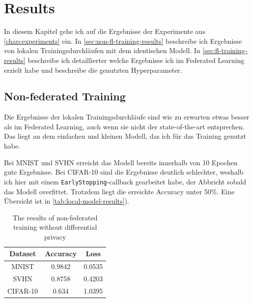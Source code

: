 \chapter{Results}\label{chap:results}

In diesem Kapitel gehe ich auf die Ergebnisse der Experimente aus \autoref{chap:experiments} ein. In \autoref{sec:non-fl-training-results} beschreibe ich Ergebnisse von lokalen Trainingsdurchläufen mit dem identischen Modell. In \autoref{sec:fl-training-results} beschreibe ich detaillierter welche Ergebnisse ich im Federated Learning erzielt habe und beschreibe die genutzten Hyperparameter.

\section{Non-federated Training} \label{sec:non-fl-training-results}
Die Ergebnisse der lokalen Trainingsdurchläufe sind wie zu erwarten etwas besser als im Federated Learning, auch wenn sie nicht der state-of-the-art entsprechen. Das liegt an dem einfachen und kleinen Modell, das ich für das Training genutzt habe.

Bei MNIST und SVHN erreicht das Modell bereits innerhalb von 10 Epochen gute Ergebnisse. Bei CIFAR-10 sind die Ergebnisse deutlich schlechter, weshalb ich hier mit einem \texttt{EarlyStopping}-callback gearbeitet habe, der Abbricht sobald das Modell overfittet. Trotzdem liegt die erreichte Accuracy unter 50\%. Eine Übersicht ist in \autoref{tab:local-model-results}).

\begin{table}
	\centering
	\begin{tabular}{ccc}
		\toprule
		Dataset & Accuracy & Loss \\
		\midrule
		MNIST & 0.9842 & 0.0535 \\
		SVHN & 0.8758 & 0.4203 \\
		CIFAR-10 & 0.634 & 1.0395 \\
		\bottomrule
	\end{tabular}
	\caption{The results of non-federated training without differential privacy}
	\label{tab:local-model-results}
\end{table}

